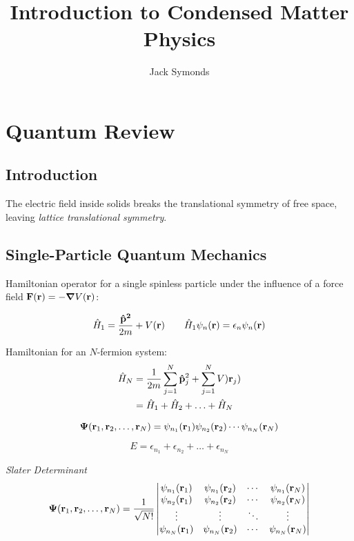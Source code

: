 \documentclass[10pt, a4paper, twocolumn]{article}
\author{Jack Symonds}
\title{Introduction to Condensed Matter Physics}
\date{}
\begin{document}
\maketitle

\section{Quantum Review}

\subsection{Introduction}

The electric field inside solids breaks the translational symmetry of free space, leaving \emph{lattice translational symmetry}. 

\subsection{Single-Particle Quantum Mechanics}

Hamiltonian operator for a single spinless particle under the influence of a force field $\vb F(\vb r ) = - \grad V (\vb r)$:

\[ \hat H _1 = \frac{\vb{\hat p ^2}}{2m} + V( \vb r )
\qquad \hat H_1 \psi _n (\vb r)
= \epsilon _n \psi _n (\vb r ) \]

Hamiltonian for an $N$-fermion system:
\begin{equation*}
\begin{aligned}
	\hat H _N &= \frac{1}{2m} \sum _{j=1}^N \vb{\hat p} _j^2
	+ \sum _{j = 1}^N V )\vb r _j )
\\	&= \hat H _1 + \hat H _2 + \ldots + \hat H _N
\end{aligned}
\end{equation*}

\[ \vb \Psi (\vb r _1, \vb r _2, \ldots , \vb r _N )
= \psi _{n_1} ( \vb r_1) \psi _{n_2} ( \vb r _2)
\cdots \psi _{n_N} (\vb r _N) \]

\[ E = \epsilon _{n_1} + \epsilon _{n_2} + \ldots
+ \epsilon _{n_N} \]

\emph{Slater Determinant}
\[
\vb \Psi ( \vb r _1 , \vb r _2 , \ldots , \vb r _N)
= \frac{1}{\sqrt{N!}}
\begin{vmatrix}
\psi _{n_1} (\vb r _1) & \psi _{n_1} (\vb r _2)
	& \cdots & \psi _{n_1} (\vb r _N)
\\ \psi _{n_2} (\vb r _1) & \psi _{n_2} (\vb r _2)
	& \cdots & \psi _{n_2} (\vb r _N)
	\\ \vdots & \vdots & \ddots & \vdots
\\ \psi _{n_N} (\vb r _1) & \psi _{n_N} (\vb r _2)
	& \cdots & \psi _{n_N} (\vb r _N)
\end{vmatrix}
\]
\end{document}
